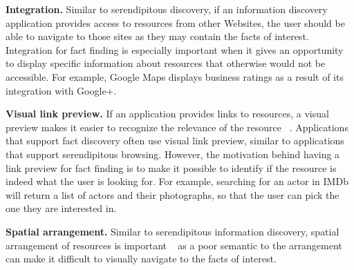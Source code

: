 {\textbf{Integration.} Similar to serendipitous discovery, if an information discovery application provides access to resources from other Websites, the user should be able to navigate to those sites as they may contain the facts of interest. Integration for fact finding is especially important when it gives an opportunity to display specific information about resources that otherwise would not be accessible. For example, Google Maps displays business ratings as a result of its integration with Google+.  

\textbf{Visual link preview.} If an application provides links to resources, a visual preview makes it easier to recognize the relevance of the resource ~\cite{abrams}. Applications that support fact discovery often use visual link preview, similar to applications that support serendipitous browsing. However, the motivation behind having a link preview for fact finding is to make it possible to identify if the resource is indeed what the user is looking for. For example, searching for an actor in IMDb will return a list of actors and their photographs, so that the user can pick the one they are interested in.

\textbf{Spatial arrangement.} Similar to serendipitous information discovery, spatial arrangement of resources is important ~\cite{abrams} as a poor semantic to the arrangement can make it difficult to visually navigate to the facts of interest.


} %

